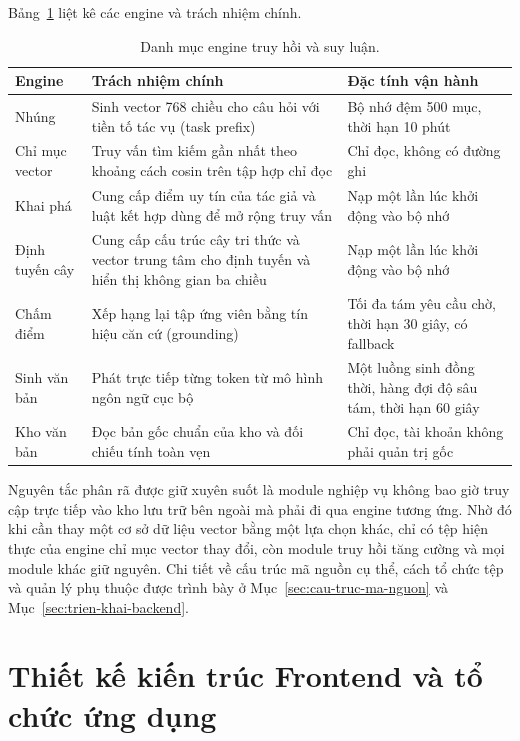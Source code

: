 Bảng~\ref{tab:engine-truy-hoi} liệt kê các engine và trách nhiệm chính.

\begin{table}[htbp]
    \centering
    \caption{Danh mục engine truy hồi và suy luận.}
    \label{tab:engine-truy-hoi}
    \small
    \begin{tabularx}{\textwidth}{@{}>{\raggedright\arraybackslash}p{2.5cm}>{\raggedright\arraybackslash}X>{\raggedright\arraybackslash}p{4.8cm}@{}}
        \toprule
        \textbf{Engine} & \textbf{Trách nhiệm chính} & \textbf{Đặc tính vận hành} \\
        \midrule
        Nhúng & Sinh vector 768 chiều cho câu hỏi với tiền tố tác vụ (task prefix) & Bộ nhớ đệm 500 mục, thời hạn 10 phút \\
        Chỉ mục vector & Truy vấn tìm kiếm gần nhất theo khoảng cách cosin trên tập hợp chỉ đọc & Chỉ đọc, không có đường ghi \\
        Khai phá & Cung cấp điểm uy tín của tác giả và luật kết hợp dùng để mở rộng truy vấn & Nạp một lần lúc khởi động vào bộ nhớ \\
        Định tuyến cây & Cung cấp cấu trúc cây tri thức và vector trung tâm cho định tuyến và hiển thị không gian ba chiều & Nạp một lần lúc khởi động vào bộ nhớ \\
        Chấm điểm & Xếp hạng lại tập ứng viên bằng tín hiệu căn cứ (grounding) & Tối đa tám yêu cầu chờ, thời hạn 30 giây, có fallback \\
        Sinh văn bản & Phát trực tiếp từng token từ mô hình ngôn ngữ cục bộ & Một luồng sinh đồng thời, hàng đợi độ sâu tám, thời hạn 60 giây \\
        Kho văn bản & Đọc bản gốc chuẩn của kho và đối chiếu tính toàn vẹn & Chỉ đọc, tài khoản không phải quản trị gốc \\
        \bottomrule
    \end{tabularx}
\end{table}

Nguyên tắc phân rã được giữ xuyên suốt là module nghiệp vụ không bao giờ truy cập trực tiếp vào kho lưu trữ bên ngoài mà phải đi qua engine tương ứng. Nhờ đó khi cần thay một cơ sở dữ liệu vector bằng một lựa chọn khác, chỉ có tệp hiện thực của engine chỉ mục vector thay đổi, còn module truy hồi tăng cường và mọi module khác giữ nguyên. Chi tiết về cấu trúc mã nguồn cụ thể, cách tổ chức tệp và quản lý phụ thuộc được trình bày ở Mục~\ref{sec:cau-truc-ma-nguon} và Mục~\ref{sec:trien-khai-backend}.

\section{Thiết kế kiến trúc Frontend và tổ chức ứng dụng}
\label{sec:kien-truc-frontend}

